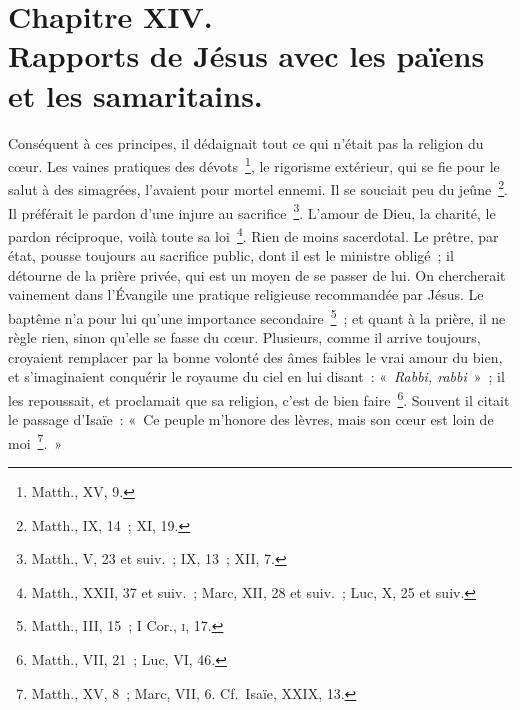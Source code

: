 \documentclass[french,twoside]{book} %
\newcommand\chapteropen{} %
\newcommand\chaptercont{} %
\begin{document}
\chapteropen
\chapter[{Chapitre XIV. Rapports de Jésus avec les païens et les samaritains.}]{Chapitre XIV.\\
Rapports de Jésus avec les païens et les samaritains.}\renewcommand{\leftmark}{Chapitre XIV.\\
Rapports de Jésus avec les païens et les samaritains.}


\chaptercont
\noindent Conséquent à ces principes, il dédaignait tout ce qui n’était pas la religion du cœur. Les vaines pratiques des dévots \footnote{Matth., XV, 9.}, le rigorisme extérieur, qui se fie pour le salut à des simagrées, l’avaient pour mortel ennemi. Il se souciait peu du jeûne \footnote{Matth., IX, 14 ; XI, 19.}. Il préférait le pardon d’une injure au sacrifice \footnote{Matth., V, 23 et suiv. ; IX, 13 ; XII, 7.}. L’amour de Dieu, la charité, le pardon réciproque, voilà toute sa loi \footnote{Matth., XXII, 37 et suiv. ; Marc, XII, 28 et suiv. ; Luc, X, 25 et suiv.}. Rien de moins sacerdotal. Le prêtre, par état, pousse toujours au sacrifice public, dont il est le ministre obligé ; il détourne de la prière privée, qui est un moyen de se passer de lui. On chercherait vainement dans l’Évangile une pratique religieuse recommandée par Jésus. Le baptême n’a pour lui qu’une importance secondaire \footnote{ Matth., III, 15 ; I Cor., \textsc{i}, 17.} ; et quant à la prière, il ne règle rien, sinon qu’elle se fasse du cœur. Plusieurs, comme il arrive toujours, croyaient remplacer par la bonne volonté des âmes faibles le vrai amour du bien, et s’imaginaient conquérir le royaume du ciel en lui disant : « {\itshape Rabbi, rabbi} » ; il les repoussait, et proclamait que sa religion, c’est de bien faire \footnote{Matth., VII, 21 ; Luc, VI, 46.}. Souvent il citait le passage d’Isaïe : « Ce peuple m’honore des lèvres, mais son cœur est loin de moi \footnote{ Matth., XV, 8 ; Marc, VII, 6. Cf. Isaïe, XXIX, 13.}. »\par
\end{document}
